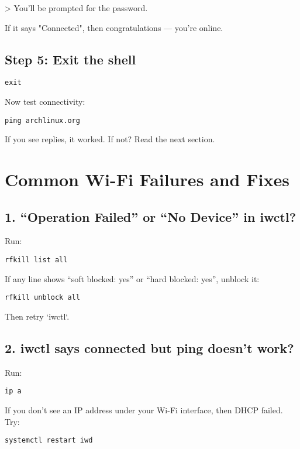 \documentclass[12pt,openany]{book}
\begin{document}
> You’ll be prompted for the password.

If it says "Connected", then congratulations — you’re online.

\subsection*{Step 5: Exit the shell}

\begin{lstlisting}
exit
\end{lstlisting}

Now test connectivity:

\begin{lstlisting}
ping archlinux.org
\end{lstlisting}

If you see replies, it worked. If not? Read the next section.

\section{Common Wi-Fi Failures and Fixes}

\subsection*{1. “Operation Failed” or “No Device” in iwctl?}

Run:

\begin{lstlisting}
rfkill list all
\end{lstlisting}

If any line shows “soft blocked: yes” or “hard blocked: yes”, unblock it:

\begin{lstlisting}
rfkill unblock all
\end{lstlisting}

Then retry `iwctl`.

\subsection*{2. iwctl says connected but ping doesn’t work?}

Run:

\begin{lstlisting}
ip a
\end{lstlisting}

If you don’t see an IP address under your Wi-Fi interface, then DHCP failed. Try:

\begin{lstlisting}
systemctl restart iwd
\end{lstlisting}
\end{document}
